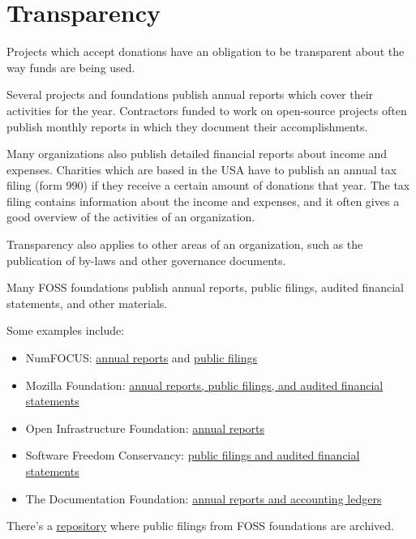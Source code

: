 


\chapter{Transparency}

Projects which accept donations have an obligation to be transparent about the way funds are being used.

Several projects and foundations publish annual reports which cover their activities for the year.  Contractors funded to work on open-source projects often publish monthly reports in which they document their accomplishments.

Many organizations also publish detailed financial reports about income and expenses.  Charities which are based in the USA have to publish an annual tax filing (form 990) if they receive a certain amount of donations that year.  The tax filing contains information about the income and expenses, and it often gives a good overview of the activities of an organization.

Transparency also applies to other areas of an organization, such as the publication of by-laws and other governance documents.

\begin{kaobox}[frametitle=Transparency of FOSS foundations]

Many FOSS foundations publish annual reports, public filings, audited financial statements, and other materials.

Some examples include:

\begin{itemize}

\item NumFOCUS: \href{https://numfocus.org/community/mission/annual-reports}{annual reports} and \href{https://numfocus.org/legal}{public filings}
\item Mozilla Foundation: \href{https://www.mozilla.org/en-US/foundation/annualreport}{annual reports, public filings, and audited financial statements}
\item Open Infrastructure Foundation: \href{https://openinfra.dev/about/}{annual reports}
\item Software Freedom Conservancy: \href{https://sfconservancy.org/about/filings/}{public filings and audited financial statements}
\item The Documentation Foundation: \href{https://www.documentfoundation.org/foundation/financials/}{annual reports and accounting ledgers}

\end{itemize}

There's a \href{https://gitlab.com/floss-foundations/npo-public-filings}{repository} where public filings from FOSS foundations are archived.

\end{kaobox}

